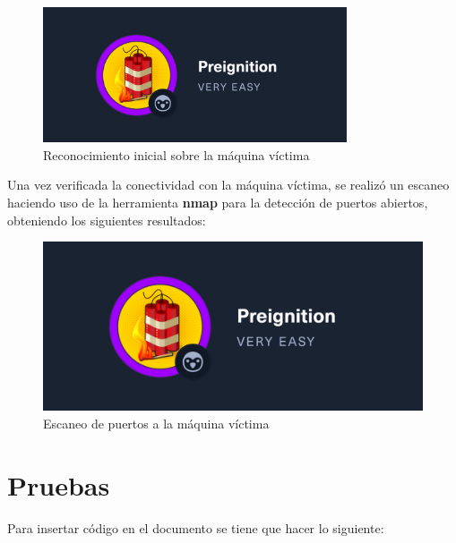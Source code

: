 \documentclass[a4paper]{article} %
\begin{document}
        \begin{figure}[h]
            \centering
            \includegraphics[width=0.8\textwidth]{img/preignitionPing.png}      %
            \caption{Reconocimiento inicial sobre la máquina víctima}
            \label{fig:reconocimiento}
        \end{figure}
        
        \vspace{0.3cm}
        
        Una vez verificada la conectividad con la máquina víctima, se realizó un escaneo haciendo uso de la herramienta \textbf{nmap} para la detección de puertos abiertos, obteniendo los siguientes resultados:
        
        \begin{figure}[h]
            \centering
            \includegraphics[width=\textwidth]{img/preignitionNmap.png}     %
            \caption{Escaneo de puertos a la máquina víctima}
            \label{fig:nmap}
        \end{figure}
        
        \clearpage
        
    \section{Pruebas}
    Para insertar código en el documento se tiene que hacer lo siguiente:
        
\end{document}
